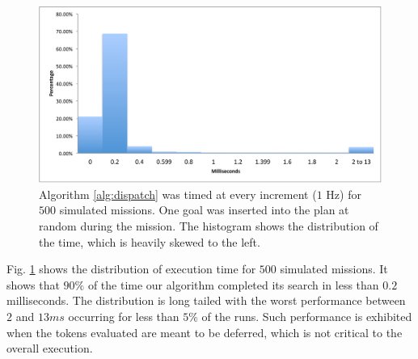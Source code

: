 \begin{figure}[!b]
  \centering
  \vskip-2mm
  \includegraphics[width=\columnwidth]{figs/HistogramAlg1}
  \vskip-3mm
  \caption{\small Algorithm \ref{alg:dispatch} was timed at every
    increment ($1$ Hz) for $500$ simulated missions. One goal was
    inserted into the plan at random during the mission. The histogram
    shows the distribution of the time, which is heavily skewed to the
    left.}
  \label{fig:histogram}
  \vskip-3mm
\end{figure}

Fig. \ref{fig:histogram} shows the distribution of execution time for
$500$ simulated missions. It shows that $90\%$ of the time our
algorithm completed its search in less than $0.2$ milliseconds. The
distribution is long tailed with the worst performance between $2$ and
$13ms$ occurring for less than $5\%$ of the runs. Such performance is
exhibited when the tokens evaluated are meant to be deferred, which is
not critical to the overall execution.



